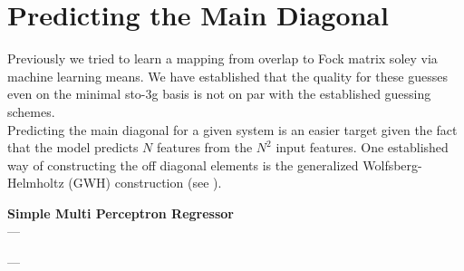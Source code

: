 \section{Predicting the Main Diagonal}
\label{sec:main_diagonal}
Previously we tried to learn a mapping from overlap to Fock matrix soley via machine learning means. We have established that the quality for these guesses even on the minimal sto-3g basis is not on par with the established guessing schemes.\\
Predicting the main diagonal for a given system is an easier target given the fact that the model predicts $N$ features from the $N^2$ input features. One established way of constructing the off diagonal elements is the generalized Wolfsberg-Helmholtz (GWH) construction \parencite{ref:gwh_wolfsberg1952spectra} (see ).

\textbf{Simple Multi Perceptron Regressor}\\


--- 
\begin{table}[h]
    \centering
    \caption{\TODO{\dots} Comparison of different guessing schemes for 102 (20\%) test samples from the  subset from QM9 \parencite{ref:article1_qm9}. The F-score is calculated using the Fock matrix prediction from the Ridge regression model and various guessing schemes implemented in \textsc{PySCF}. The number of iterations until convergence is shown as well as the percentage samples not converging within 50 iterations and the inference time as a factor of the inference time of the minao guess.}
    \label{tab:NN_basic_metrics}
\end{table}
---


